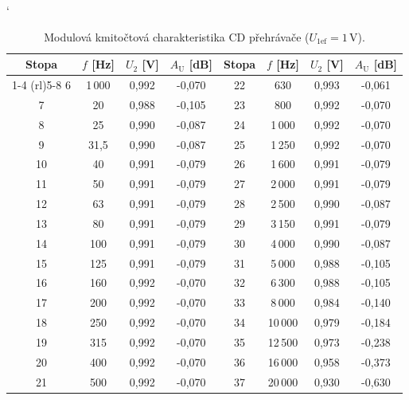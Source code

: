\documentclass[a4paper, czech]{article}
\begin{document}
\begin{table}[H]
    \centering
    \catcode`
    \caption{Modulová kmitočtová charakteristika CD přehrávače ($U_{1\text{ef}} = 1\,$V).}
    \begin{tabular}{cccccccc}
        \toprule
        Stopa & $f$ {[}Hz{]} & $U_2$ {[}V{]} & $A_\text{U}$ {[}dB{]} & Stopa & $f$ {[}Hz{]} & $U_2$ {[}V{]} & $A_\text{U}$ {[}dB{]} \\
        \cmidrule(rl){1-4}
        \cmidrule(rl){5-8}
        6     & 1\,000       & 0,992      & -0,070      & 22    & 630        & 0,993      & -0,061      \\
        7     & 20         & 0,988      & -0,105      & 23    & 800        & 0,992      & -0,070      \\
        8     & 25         & 0,990      & -0,087      & 24    & 1\,000       & 0,992      & -0,070      \\
        9     & 31,5       & 0,990      & -0,087      & 25    & 1\,250       & 0,992      & -0,070      \\
        10    & 40         & 0,991      & -0,079      & 26    & 1\,600       & 0,991      & -0,079      \\
        11    & 50         & 0,991      & -0,079      & 27    & 2\,000       & 0,991      & -0,079      \\
        12    & 63         & 0,991      & -0,079      & 28    & 2\,500       & 0,990      & -0,087      \\
        13    & 80         & 0,991      & -0,079      & 29    & 3\,150       & 0,991      & -0,079      \\
        14    & 100        & 0,991      & -0,079      & 30    & 4\,000       & 0,990      & -0,087      \\
        15    & 125        & 0,991      & -0,079      & 31    & 5\,000       & 0,988      & -0,105      \\
        16    & 160        & 0,992      & -0,070      & 32    & 6\,300       & 0,988      & -0,105      \\
        17    & 200        & 0,992      & -0,070      & 33    & 8\,000       & 0,984      & -0,140      \\
        18    & 250        & 0,992      & -0,070      & 34    & 10\,000      & 0,979      & -0,184      \\
        19    & 315        & 0,992      & -0,070      & 35    & 12\,500      & 0,973      & -0,238      \\
        20    & 400        & 0,992      & -0,070      & 36    & 16\,000      & 0,958      & -0,373      \\
        21    & 500        & 0,992      & -0,070      & 37    & 20\,000      & 0,930      & -0,630      \\
    \bottomrule
    \end{tabular}
\end{table}
\end{document}
